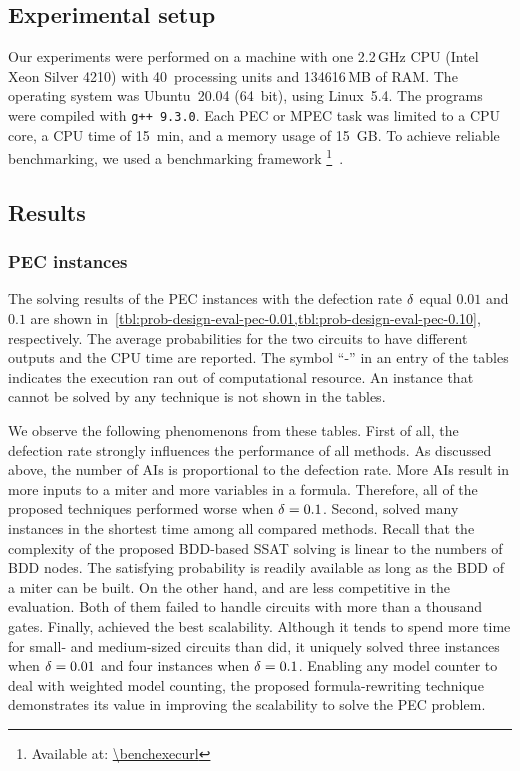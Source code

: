 \subsection{Experimental setup}
Our experiments were performed on a machine with
one 2.2\,GHz CPU (Intel Xeon Silver 4210) with 40~processing units and 134616\,MB of RAM.
The operating system was Ubuntu~20.04 (64~bit),
using Linux~5.4.
The programs were compiled with \texttt{g++ 9.3.0}.
Each PEC or MPEC task was limited to a CPU core,
a CPU time of \SI{15}{min},
and a memory usage of \SI{15}{GB}.
To achieve reliable benchmarking,
we used a benchmarking framework \benchexec\footnote{Available at: \url{\benchexecurl}}~\cite{Benchmarking-STTT}.

\subsection{Results}

\subsubsection{PEC instances}
The solving results of the PEC instances with the defection rate $\delta$ equal $0.01$ and $0.1$
are shown in~\cref{tbl:prob-design-eval-pec-0.01,tbl:prob-design-eval-pec-0.10}, respectively.
The average probabilities for the two circuits to have different outputs and the CPU time are reported.
The symbol ``-'' in an entry of the tables indicates the execution ran out of computational resource.
An instance that cannot be solved by any technique is not shown in the tables.

We observe the following phenomenons from these tables.
First of all, the defection rate strongly influences the performance of all methods.
As discussed above, the number of AIs is proportional to the defection rate.
More AIs result in more inputs to a miter and more variables in a formula.
Therefore, all of the proposed techniques performed worse when $\delta=0.1$.
Second, \bddsp solved many instances in the shortest time among all compared methods.
Recall that the complexity of the proposed BDD-based SSAT solving is linear to the numbers of BDD nodes.
The satisfying probability is readily available as long as the BDD of a miter can be built.
On the other hand, \dcssat and \cachet are less competitive in the evaluation.
Both of them failed to handle circuits with more than a thousand gates.
Finally, \approxmc achieved the best scalability.
Although it tends to spend more time for small- and medium-sized circuits than \bddsp did,
it uniquely solved three instances when $\delta=0.01$ and four instances when $\delta=0.1$.
Enabling any model counter to deal with weighted model counting,
the proposed formula-rewriting technique demonstrates its value
in improving the scalability to solve the PEC problem.

